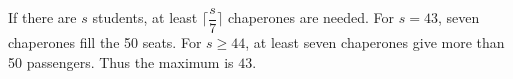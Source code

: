 If there are $s$ students, at least $\lceil \dfrac{s}{7}\rceil$ chaperones are needed. For $s=43$, seven chaperones fill the 50 seats. For $s\ge44$, at least seven chaperones give more than 50 passengers. Thus the maximum is $\boxed{43}$.
